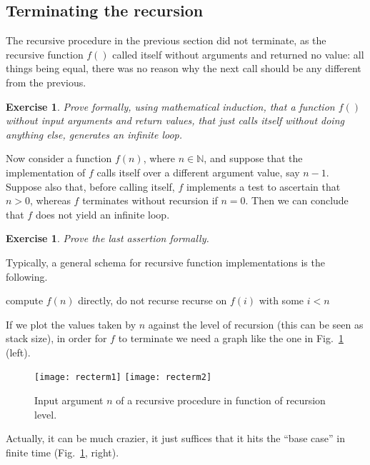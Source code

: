 \documentclass[a4paper]{book}
\theoremstyle{changebreak}                %
\newtheorem{ex}[result]{Exercise}
\begin{document}
\subsection{Terminating the recursion}
The recursive procedure in the previous section did not terminate, as
the recursive function $f()$ called itself without arguments and
returned no value: all things being equal, there was no reason why the
next call should be any different from the previous. 

\begin{ex}
Prove formally, using mathematical
induction, that a function $f()$ without
input arguments and return
values, that just calls itself without doing
anything else, generates an infinite loop.
\end{ex}

Now consider a function $f(n)$, where $n\in\mathbb{N}$, and suppose
that the implementation of $f$ calls itself over a different argument
value, say $n-1$. Suppose also that, before calling itself, $f$
implements a test to ascertain that $n>0$,
whereas $f$ terminates without recursion if $n=0$. Then we can
conclude that $f$ does not yield an infinite loop.

\begin{ex}
Prove the last assertion formally.
\end{ex}

Typically, a general schema for recursive function implementations is
the following.
\begin{algorithmic}
  \STATE compute $f(n)$ directly, do not recurse
\ELSE
  \STATE recurse on $f(i)$ with some $i<n$
\ENDIF
\end{algorithmic}
If we plot the values taken by $n$ against the level of
recursion (this can be seen as stack
size), in order for $f$ to terminate we need a graph
like the one in Fig.~\ref{f:recterm} (left).
\begin{figure}[!ht]
\begin{center}
\texttt{[image: recterm1]}
\texttt{[image: recterm2]}
\end{center}
\caption{Input argument $n$ of a recursive
  procedure in function of recursion level.}
\label{f:recterm}
\end{figure}
Actually, it can be much crazier, it just suffices that it hits the
``base case'' in finite time (Fig.~\ref{f:recterm}, right).
\end{document}
